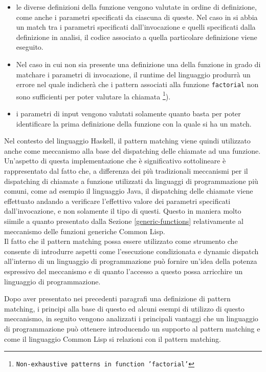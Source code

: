 \begin{itemize}

\item le diverse definizioni della funzione vengono valutate in ordine di
definizione, come anche i parametri specificati da ciascuna di queste. Nel caso
in si abbia un match tra i parametri specificati dall'invocazione e quelli
specificati dalla definizione in analisi, il codice associato a quella
particolare definizione viene eseguito.

\item Nel caso in cui non sia presente una definizione una della funzione in
grado di matchare i parametri di invocazione, il runtime del linguaggio produrrà
un errore nel quale indicherà che i pattern associati alla funzione
\texttt{factorial} non sono sufficienti per poter valutare la chiamata
\footnote{\texttt {Non-exhaustive patterns in function 'factorial'}}).

\item i parametri di input vengono valutati solamente quanto basta per poter
identificare la prima definizione della funzione con la quale si ha un match.

\end{itemize}

Nel contesto del linguaggio Haskell, il pattern matching viene quindi utilizzato
anche come meccanismo alla base del dispatching delle chiamate ad una funzione.
Un’aspetto di questa implementazione che è significativo sottolineare è
rappresentato dal fatto che, a differenza dei più tradizionali meccanismi per il
dispatching di chiamate a funzione utilizzati da linguaggi di programmazione più
comuni, come ad esempio il linguaggio Java, il dispatching delle chiamate viene
effettuato andando a verificare l’effettivo valore dei parametri specificati
dall’invocazione, e non solamente il tipo di questi. Questo in maniera molto
siimile a quanto presentato dalla Sezione \ref{generic-functions} relativamente
al meccanismo delle funzioni generiche Common Lisp.\\

Il fatto che il pattern matching possa essere utilizzato come strumento che
consente di introdurre aspetti come l’esecuzione condizionata e dynamic dispatch
all’interno di un linguaggio di programmazione può fornire un’idea della potenza
espressivo del meccanismo e di quanto l'accesso a questo possa arricchire un
linguaggio di programmazione.

Dopo aver presentato nei precedenti paragrafi una definizione di pattern
matching, i principi alla base di questo ed alcuni esempi di utilizzo di questo
meccanismo, in seguito vengono analizzati i principali vantaggi che un
linguaggio di programmazione può ottenere introducendo un supporto al pattern
matching e come il linguaggio Common Lisp si relazioni con il pattern
matching.\\

